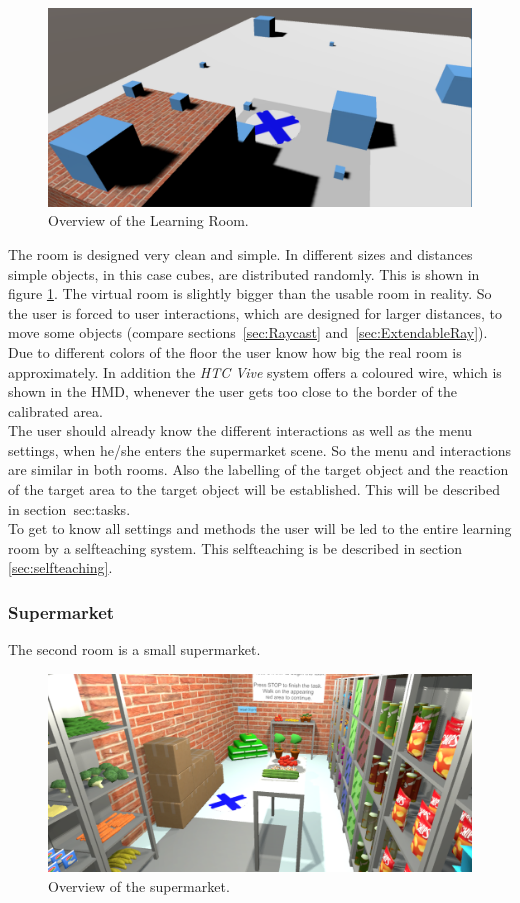 \begin{figure}[H] 
	\center 
	\includegraphics[width=12cm]{Images/learningRoom2.PNG}			
	\caption[Overview of the Learning Room.]{Overview of the Learning Room.}
	\label{fig:learning room}
\end{figure}

The room is designed very clean and simple. In different sizes and distances simple objects, in this case cubes, are distributed randomly. This is shown in figure \ref{fig:learning room}. The virtual room is slightly bigger than the usable room in reality. So the user is forced to user interactions, which are designed for larger distances, to move some objects (compare sections~\ref{sec:Raycast} and~\ref{sec:ExtendableRay}). Due to different colors of the floor the user know how big the real room is approximately. In addition the \textit{HTC Vive} system offers a coloured wire, which is shown in the HMD, whenever the user gets too close to the border of the calibrated area.\\
The user should already know the different interactions as well as the menu settings, when he/she enters the supermarket scene. So the menu and interactions are similar in both rooms. Also the labelling of the target object and the reaction of the target area to the target object will be established. This will be described in section~{sec:tasks}.\\ 
To get to know all settings and methods the user will be led to the entire learning room by a selfteaching system. This selfteaching is be described in section \ref{sec:selfteaching}. 


\subsubsection{Supermarket} \label{sec:supermarket} 
The second room is a small supermarket. 

\begin{figure}[H] 
	\center 
	\includegraphics[width=12cm]{Images/supermarket.PNG}
	\caption[Overview of the supermarket.]{Overview of the supermarket.}
	\label{fig:supermarket}
\end{figure}

